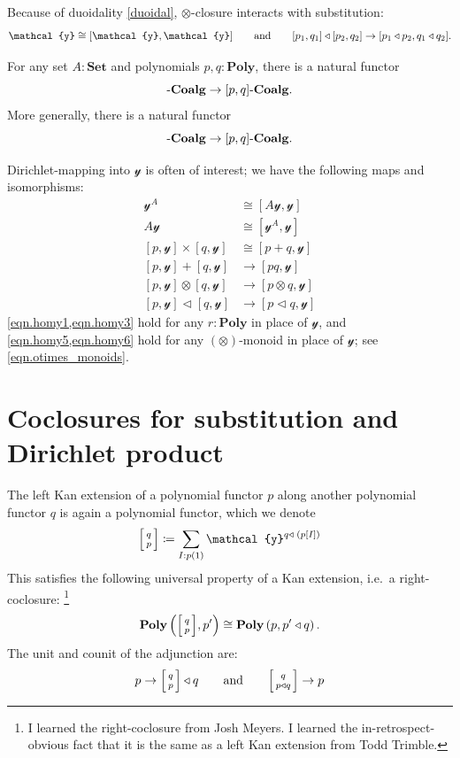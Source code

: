 \documentclass[11pt, one side, article]{memoir}
\makeatletter
\theoremstyle{definition}
\theoremstyle{plain}
\newcommand{\Cat}[1]{\mathbf{#1}}%
\newcommand{\Fun}[1]{\mathsf{#1}}%
\newcommand{\To}[2][]{\xrightarrow[#1]{\tn{$#2$}}}
\newcommand{\tn}[1]{\textnormal{#1}}
\newcommand{\smset}{\Cat{Set}}
\newcommand{\yon}{{\mathcal{y}}}
\newcommand{\poly}{\Cat{Poly}}
\newcommand{\0}{\textsf{0}}
\newcommand{\1}{\tn{\textsf{1}}}
\newcommand{\tri}{\mathbin{\triangleleft}}
\newcommand{\indep}{\Fun{Indep}}
\newcommand{\biglens}[2]{
     \begin{bmatrix}{\vphantom{f_f^f}#2} \\ {\vphantom{f_f^f}#1} \end{bmatrix}
}
\newcommand{\littlelens}[2]{
     \begin{bsmallmatrix}{\vphantom{f}#2} \\ {\vphantom{f}#1} \end{bsmallmatrix}
}
\newcommand{\lens}[2]{
  \relax\if@display
     \biglens{#1}{#2}
  \else
     \littlelens{#1}{#2}
  \fi
}
\newcommand{\hh}[2][]{#1 \tn{#2} #1}
\newcommand{\qqand}{\hh[\qquad]{and}}
\newcommand{\coalg}{\tn{-}\Cat{Coalg}}
\makeatother
\begin{document}
Because of duoidality \eqref{duoidal}, $\otimes$-closure interacts with substitution:
\begin{equation}\label{eqn.shapiro_1}
	\yon\cong[\yon,\yon]
	\qqand
	[p_1,q_1]\tri[p_2,q_2]\to [p_1\tri p_2,q_1\tri q_2].
\end{equation}

For any set $A:\smset$ and polynomials $p,q:\poly$, there is a natural functor
\begin{equation}
[Ap,Aq]\coalg\to[p,q]\coalg.
\end{equation}
More generally, there is a natural functor
\begin{equation}
[A\yon\tri p,q\tri A\yon]\coalg\to[p,q]\coalg.
\end{equation}


Dirichlet-mapping into $\yon$ is often of interest; we have the following maps and isomorphisms:
\begin{align}
\label{eqn.homy2}
  \yon^A&\cong[A\yon,\yon]\\
\label{eqn.homy4}
  A\yon&\cong[\yon^A,\yon]\\
\label{eqn.homy1}
  [p,\yon]\times[q,\yon]&\cong[p+q,\yon]\\
\label{eqn.homy3}
  [p,\yon]+[q,\yon]&\to[pq,\yon]\\
\label{eqn.homy5}
	[p,\yon]\otimes[q,\yon]&\to[p\otimes q,\yon]\\
\label{eqn.homy6}
	[p,\yon]\tri[q,\yon]&\to[p\tri q,\yon]
\end{align}
\cref{eqn.homy1,eqn.homy3} hold for any $r:\poly$ in place of $\yon$, and \cref{eqn.homy5,eqn.homy6} hold for any $(\otimes)$-monoid in place of $\yon$; see \cref{eqn.otimes_monoids}.


\chapter{Coclosures for substitution and Dirichlet product}

The left Kan extension of a polynomial functor $p$ along another polynomial functor $q$ is again a polynomial functor, which we denote
\begin{equation}
\lens{p}{q}\coloneqq\sum_{I: p(1)}\yon^{q\tri\; (p[I])}
\end{equation}
This satisfies the following universal property of a Kan extension, i.e.\ a right-coclosure:%
\footnote{I learned the right-coclosure from Josh Meyers. I learned the in-retrospect-obvious fact that it is the same as a left Kan extension from Todd Trimble.}
\begin{equation}\label{eqn.cocl_define}
	\poly\left(\lens{p}{q},p'\right)\cong\poly\left(p,p'\tri q\right).
\end{equation}
The unit and counit of the adjunction are:
\begin{equation}\label{eqn.coclosure_unit_counit}
  p\to\lens{p}{q}\tri q
  \qqand
	\lens{p\tri q}{q}\to p
\end{equation}
\end{document}

